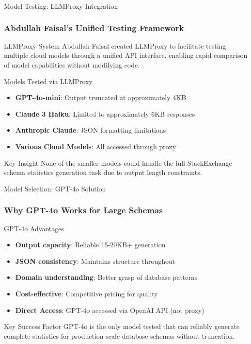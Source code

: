 \documentclass{beamer}
\begin{document}
\begin{frame}{Model Testing: LLMProxy Integration}
\frametitle{Abdullah Faisal's Unified Testing Framework}

\begin{block}{LLMProxy System}
Abdullah Faisal created LLMProxy to facilitate testing multiple cloud models through a unified API interface, enabling rapid comparison of model capabilities without modifying code.
\end{block}

\begin{exampleblock}{Models Tested via LLMProxy}
\begin{itemize}
    \item \textbf{GPT-4o-mini}: Output truncated at approximately 4KB
    \item \textbf{Claude 3 Haiku}: Limited to approximately 6KB responses
    \item \textbf{Anthropic Claude}: JSON formatting limitations
    \item \textbf{Various Cloud Models}: All accessed through proxy
\end{itemize}
\end{exampleblock}

\begin{alertblock}{Key Insight}
None of the smaller models could handle the full StackExchange schema statistics generation task due to output length constraints.
\end{alertblock}

\end{frame}

\begin{frame}{Model Selection: GPT-4o Solution}
\frametitle{Why GPT-4o Works for Large Schemas}

\begin{block}{GPT-4o Advantages}
\begin{itemize}
    \item \textbf{Output capacity}: Reliable 15-20KB+ generation
    \item \textbf{JSON consistency}: Maintains structure throughout
    \item \textbf{Domain understanding}: Better grasp of database patterns
    \item \textbf{Cost-effective}: Competitive pricing for quality
    \item \textbf{Direct Access}: GPT-4o accessed via OpenAI API (not proxy)
\end{itemize}
\end{block}

\begin{alertblock}{Key Success Factor}
GPT-4o is the only model tested that can reliably generate complete statistics for production-scale database schemas without truncation.
\end{alertblock}

\end{frame}
\end{document}
